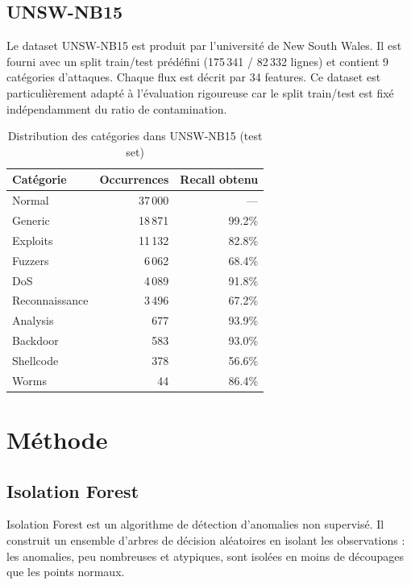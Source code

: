 \documentclass[11pt,a4paper]{article}
\begin{document}
\subsection{UNSW-NB15}

Le dataset UNSW-NB15 \cite{unswnb15} est produit par l'université de New South
Wales. Il est fourni avec un split train/test prédéfini (175\,341 / 82\,332 lignes)
et contient 9 catégories d'attaques. Chaque flux est décrit par 34 features.
Ce dataset est particulièrement adapté à l'évaluation rigoureuse car le split
train/test est fixé indépendamment du ratio de contamination.

\begin{table}[H]
\centering
\caption{Distribution des catégories dans UNSW-NB15 (test set)}
\begin{tabular}{lrr}
\toprule
\textbf{Catégorie} & \textbf{Occurrences} & \textbf{Recall obtenu} \\
\midrule
Normal         & 37\,000 & ---    \\
Generic        & 18\,871 & 99.2\% \\
Exploits       & 11\,132 & 82.8\% \\
Fuzzers        &  6\,062 & 68.4\% \\
DoS            &  4\,089 & 91.8\% \\
Reconnaissance &  3\,496 & 67.2\% \\
Analysis       &    677  & 93.9\% \\
Backdoor       &    583  & 93.0\% \\
Shellcode      &    378  & 56.6\% \\
Worms          &     44  & 86.4\% \\
\bottomrule
\end{tabular}
\end{table}

\section{Méthode}

\subsection{Isolation Forest}

Isolation Forest \cite{iforest} est un algorithme de détection d'anomalies
non supervisé. Il construit un ensemble d'arbres de décision aléatoires en
isolant les observations : les anomalies, peu nombreuses et atypiques, sont
isolées en moins de découpages que les points normaux.
\end{document}
